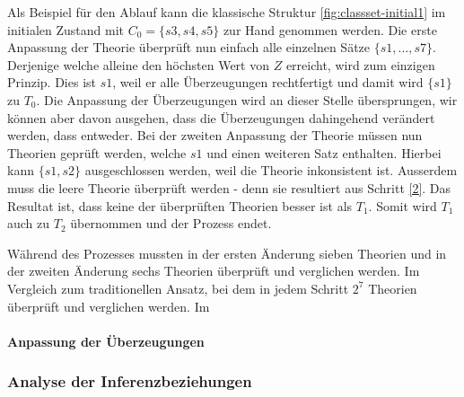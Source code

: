 \documentclass{article}
\begin{document}
 Als Beispiel für den Ablauf kann die klassische Struktur \ref{fig:classset-initial1} im initialen Zustand mit $C_0 = \{s3, s4, s5\}$ zur Hand genommen werden. Die erste Anpassung der Theorie überprüft nun einfach alle einzelnen Sätze $\{s1,...,s7\}$. Derjenige welche alleine den höchsten Wert von $Z$ erreicht, wird zum einzigen Prinzip. Dies ist $s1$, weil er alle Überzeugungen rechtfertigt und damit wird $\{s1\}$ zu $T_0$. Die Anpassung der Überzeugungen wird an dieser Stelle übersprungen, wir können aber davon ausgehen, dass die Überzeugungen dahingehend verändert werden, dass entweder. Bei der zweiten Anpassung der Theorie müssen nun Theorien geprüft werden, welche $s1$ und einen weiteren Satz enthalten. Hierbei kann $\{s1,s2\}$ ausgeschlossen werden, weil die Theorie inkonsistent ist. Ausserdem muss die leere Theorie überprüft werden - denn sie resultiert aus Schritt \ref{2}. Das Resultat ist, dass keine der überprüften Theorien besser ist als $T_1$. Somit wird $T_1$ auch zu $T_2$ übernommen und der Prozess endet.
 
 Während des Prozesses mussten in der ersten Änderung sieben Theorien und in der zweiten Änderung sechs Theorien überprüft und verglichen werden.  Im Vergleich zum traditionellen Ansatz, bei dem in jedem Schritt $2^7$ Theorien überprüft und verglichen werden. Im




\paragraph{Anpassung der Überzeugungen}

\subsubsection{Analyse der Inferenzbeziehungen}



\newpage
%
%
\printbibliography
\end{document}
